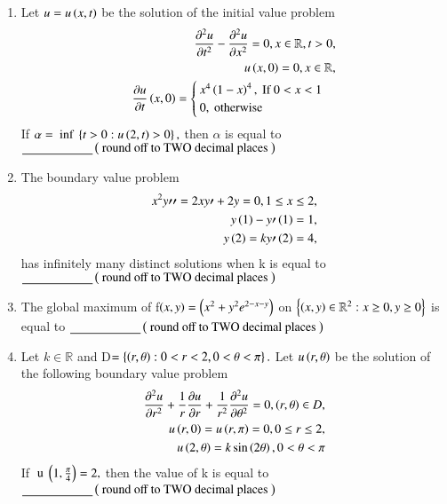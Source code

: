 \documentclass[journal]{IEEEtran}
\begin{document}
\begin{enumerate} [start=53]
\begin{align*}
    \int F.dr
\end{align*}
is equal to $\underline{\hspace{2cm}} \brak{\text{ round off to TWO decimal places }}$
\bigskip
\item Let $u=u\left(x,t\right)$ be the solution of the initial value problem 
\begin{align*}
    \frac{\partial^{2}u}{\partial t^{2}}-\frac{\partial^{2}u}{\partial x^{2}}=0,x\in\mathbb{R},t>0,\\
    u\left(x,0\right)=0,x\in\mathbb{R},\\
    \frac{\partial u}{\partial t}\left(x,0\right)=
    \begin{cases}
        x^{4}\left(1-x\right)^{4}, \text{ If }0<x<1\\
        0, \text{ otherwise }
    \end{cases}
\end{align*}
If $\alpha=\text{ inf }\left\{t>0:u\left(2,t\right)>0\right\},$ then $\alpha$ is equal to $\underline{\hspace{2cm}} \brak{\text{ round off to TWO decimal places }}$
\bigskip
\item The boundary value problem
\begin{align}
    x^{2}y\prime\prime=2xy\prime+2y=0, 1\leq x\leq2,\\
    y\left(1\right)-y\prime\left(1\right)=1,\\
    y\left(2\right)=ky\prime\left(2\right)=4,\\
\end{align}
has infinitely many distinct solutions when k is equal to   $\underline{\hspace{2cm}} \brak{\text{ round off to TWO decimal places }}$
\bigskip
\item The global maximum of f$\left(x,y\right)=\left(x^{2}+y^{2}e^{2-x-y}\right)$ on $\left\{\left(x,y\right)\in\mathbb{R}^{2}:x\geq0,y\geq0\right\}$ is equal to $\underline{\hspace{2cm}} \brak{\text{ round off to TWO decimal places }}$
\bigskip
\item Let $k\in\mathbb{R}$ and D$=\left\{\left(r,\theta\right):0<r<2,0<\theta<\pi\right\}.$ Let $u\left(r,\theta\right)$ be the solution of the
following boundary value problem
\begin{align*}
    \frac{\partial^{2}u}{\partial r^{2}}+\frac{1}{r}\frac{\partial u}{\partial r}+\frac{1}{r^{2}}\frac{\partial^{2}u}{\partial \theta^{2}}=0,\left(r,\theta\right)\in D,\\
    u\left(r,0\right)=u\left(r,\pi\right)=0, 0\leq r\leq2,\\
    u\left(2,\theta\right)=k\sin\left(2\theta\right),0<\theta<\pi\\
\end{align*}
If $\text{ u }\left(1,\frac{\pi}{4}\right)=2,$ then the value of k is equal to $\underline{\hspace{2cm}} \brak{\text{ round off to TWO decimal places }}$







\end{enumerate}
\end{document}
